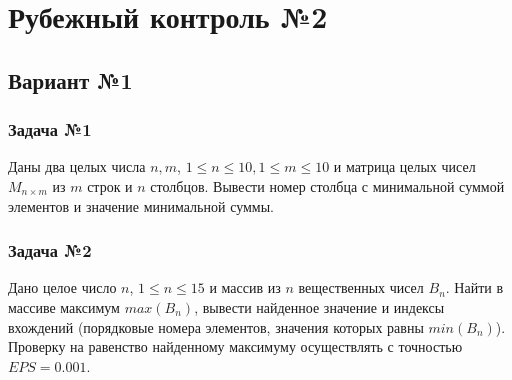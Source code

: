 \documentclass[12pt,a5paper,landscape]{article}
\begin{document}
\parindent=1cm
\pagestyle{empty}



\clearpage
\section*{Рубежный контроль №2}
\subsection*{Вариант №1}
\subsubsection*{Задача №1}
Даны два целых числа $n, m$, $1 \le n \le 10, 1 \le m \le 10$ и матрица целых чисел $M_{n \times m}$ из $m$ строк и $n$ столбцов. Вывести номер столбца с минимальной суммой элементов и значение минимальной суммы.
\subsubsection*{Задача №2}
Дано целое число $n$, $1 \le n \le 15$ и массив из $n$ вещественных чисел $B_{n}$. Найти в массиве максимум $max(B_n)$, вывести найденное значение и индексы вхождений (порядковые номера элементов, значения которых равны $min(B_n)$). Проверку на равенство найденному максимуму осуществлять с точностью $EPS = 0.001$.
\end{document}
